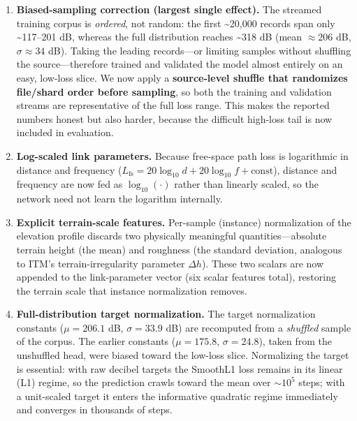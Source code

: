 \documentclass[
]{article}
\begin{document}
\begin{enumerate}
\def\labelenumi{\arabic{enumi}.}
\item
  \textbf{Biased-sampling correction (largest single effect).} The
  streamed training corpus is \emph{ordered}, not random: the first
  \textasciitilde20,000 records span only \textasciitilde117--201 dB,
  whereas the full distribution reaches \textasciitilde318 dB (mean
  \(\approx 206\) dB, \(\sigma \approx 34\) dB). Taking the leading
  records---or limiting samples without shuffling the source---therefore
  trained and validated the model almost entirely on an easy, low-loss
  slice. We now apply a \textbf{source-level shuffle that randomizes
  file/shard order before sampling}, so both the training and validation
  streams are representative of the full loss range. This makes the
  reported numbers honest but also harder, because the difficult
  high-loss tail is now included in evaluation.
\item
  \textbf{Log-scaled link parameters.} Because free-space path loss is
  logarithmic in distance and frequency
  (\(L_\text{fs} = 20\log_{10} d + 20\log_{10} f + \text{const}\)),
  distance and frequency are now fed as \(\log_{10}(\cdot)\) rather than
  linearly scaled, so the network need not learn the logarithm
  internally.
\item
  \textbf{Explicit terrain-scale features.} Per-sample (instance)
  normalization of the elevation profile discards two physically
  meaningful quantities---absolute terrain height (the mean) and
  roughness (the standard deviation, analogous to ITM's
  terrain-irregularity parameter \(\Delta h\)). These two scalars are
  now appended to the link-parameter vector (six scalar features total),
  restoring the terrain scale that instance normalization removes.
\item
  \textbf{Full-distribution target normalization.} The target
  normalization constants (\(\mu = 206.1\) dB, \(\sigma = 33.9\) dB) are
  recomputed from a \emph{shuffled} sample of the corpus. The earlier
  constants (\(\mu = 175.8\), \(\sigma = 24.8\)), taken from the
  unshuffled head, were biased toward the low-loss slice. Normalizing
  the target is essential: with raw decibel targets the SmoothL1 loss
  remains in its linear (L1) regime, so the prediction crawls toward the
  mean over \(\sim10^5\) steps; with a unit-scaled target it enters the
  informative quadratic regime immediately and converges in thousands of
  steps.
\end{enumerate}
\end{document}
